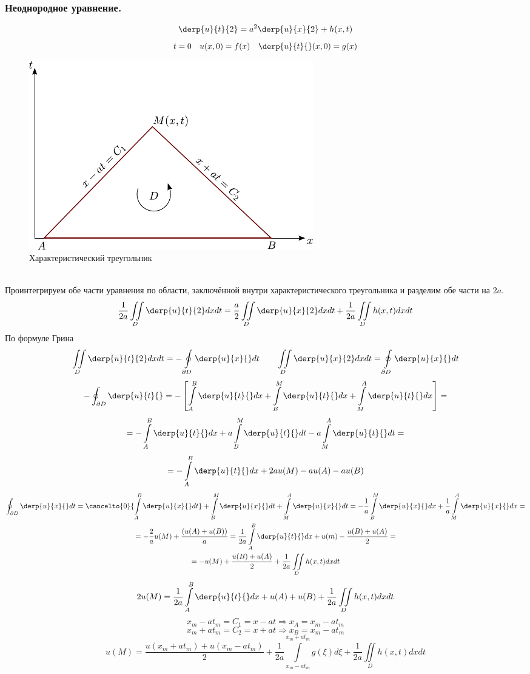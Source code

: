 \subsubsection{Неоднородное уравнение.}
		\[
			\derp{u}{t}{2} = a^2 \derp{u}{x}{2} + h(x, t)
		\]
		\[
			t = 0 \quad u(x, 0) = f(x) \quad \derp{u}{t}{} (x, 0) = g(x)
		\]
		\begin{figure}[h!] 
			\centering 
			\includegraphics[width=0.6\textwidth]{figStringKoshi.pdf}
			\caption{Характеристический треугольник}
		\end{figure}\\
		Проинтегрируем обе части уравнения по области, заключённой внутри характеристического треугольника и разделим обе части на $2 a$.
		\[
			\frac{1}{2a} \iint\limits_D \derp{u}{t}{2} dx dt = \frac{a}{2} \iint\limits_D \derp{u}{x}{2} dx dt + \frac{1}{2 a} \iint\limits_D h(x, t) dx dt
		\]
		По формуле Грина 
		\[
			\iint\limits_D \derp{u}{t}{2} dxdt = - \oint\limits_{\partial D} \derp{u}{x}{} dt \qquad \iint\limits_D \derp{u}{x}{2} dx dt = \oint\limits_{\partial D} \derp{u}{x}{} dt
		\]
		\[
			- \oint_{\partial D} \derp{u}{t}{} = - \left[ \int\limits_A^B \derp{u}{t}{} dx + \int\limits_B^M \derp{u}{t}{} dx + \int\limits_M^A \derp{u}{t}{} dx \right] = 
		\]
		\[ 
			= - \int\limits_A^B \derp{u}{t}{} dx + a \int\limits_B^M \derp{u}{t}{} dt - a \int\limits_M^A \derp{u}{t}{} dt = 
		\]
		\[ 
			= - \int\limits_A^B \derp{u}{t}{} dx + 2 a u(M) - a u(A) - a u(B)
		\]
		\begin{multline*}
			\oint_{\partial D} \derp{u}{x}{} dt = \cancelto{0}{\int\limits_A^B \derp{u}{x}{} dt} + \int\limits_B^M \derp{u}{x}{} dt + \int\limits_M^A \derp{u}{x}{} dt = - \frac{1}{a} \int\limits_B^M \derp{u}{x}{} dx + \frac{1}{a} \int\limits_M^A \derp{u}{x}{} dx = \\ 
			=- \frac{2}{a} u(M) + \frac{(u(A) +u(B))}{a} = \frac{1}{2 a} \int\limits_A^B \derp{u}{t}{} dx + u(m) - \frac{u(B) +u(A)}{2} =\\=
			 - u(M) + \frac{u(B)+u(A)}{2}  + \frac{1}{2a} \iint\limits_D h(x, t) dx dt
		\end{multline*}
		\[
			2 u(M) = \frac{1}{2a} \int\limits_A^B \derp{u}{t}{} dx + u(A) +u(B) + \frac{1}{2a} \iint\limits_D h(x, t) dx dt
		\]
		\[
			x_m - at_m = C_1 = x - at \Rightarrow x_A = x_m - at_m
		\]
		\[
			x_m + at_m = C_2 = x + at \Rightarrow x_B = x_m - at_m
		\]
		\[
			u(M) = \frac{u(x_m +at_m) + u(x_m - a t_m)}{2} + \frac{1}{2a} \int\limits_{x_m - at_m}^{x_m + a t_m} g(\xi) d \xi + \frac{1}{2a} \iint\limits_D h(x, t) dx dt
		\]



